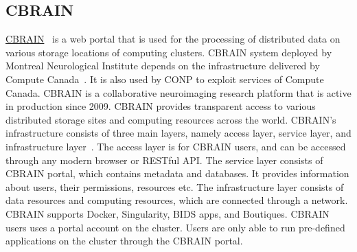 \documentclass[a4paper,num-refs]{oup-contemporary}
\begin{document}
\subsection{CBRAIN}

\href{http://github.com/aces/cbrain}{CBRAIN}~\cite{sherif2014cbrain} is a web portal that is
used for the processing of distributed data on various storage locations of computing
clusters. CBRAIN system deployed by Montreal Neurological Institute depends on the infrastructure
delivered by Compute Canada~\cite{das2016mni}.
It is also used by CONP to exploit services of Compute Canada. CBRAIN is a collaborative
neuroimaging research platform that is active in production since 2009. CBRAIN
provides transparent access to various distributed storage sites and computing
resources across the world. CBRAIN’s infrastructure consists of three main
layers, namely access layer, service layer, and infrastructure layer~\cite{sherif2014cbrain}. The access
layer is for CBRAIN users, and can be accessed through any modern browser or
RESTful API. The service layer consists of CBRAIN portal, which contains
metadata and databases. It provides information about users, their permissions,
resources etc. The infrastructure layer consists of data resources and computing
resources, which are connected through a network. 
CBRAIN supports Docker, Singularity, BIDS apps, and Boutiques.
CBRAIN users uses a portal
account on the cluster. Users are only able to
run pre-defined applications on the cluster through the CBRAIN portal.

%

\end{document}
